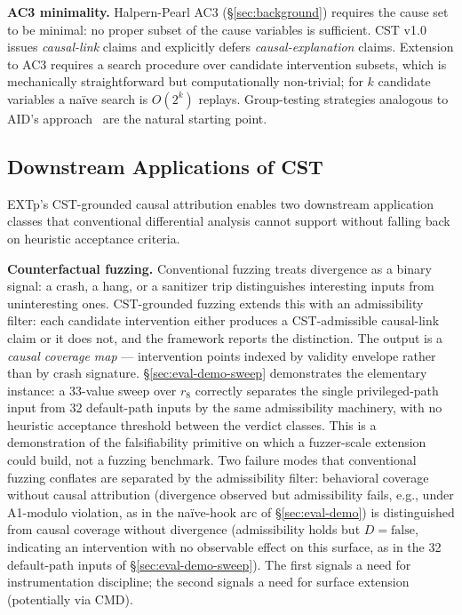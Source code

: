 \documentclass[conference]{IEEEtran}
\begin{document}
\textbf{AC3 minimality.} Halpern-Pearl AC3
(\S\ref{sec:background}) requires the cause set to be minimal:
no proper subset of the cause variables is sufficient. CST v1.0
issues \emph{causal-link} claims and explicitly defers
\emph{causal-explanation} claims. Extension to AC3 requires a
search procedure over candidate intervention subsets, which is
mechanically straightforward but computationally non-trivial; for
$k$ candidate variables a naïve search is $O(2^k)$ replays.
Group-testing strategies analogous to AID's
approach~\cite{fariha2020aid} are the natural starting point.

\subsection{Downstream Applications of CST}\label{sec:discussion-fuzz}

EXTp's CST-grounded causal attribution enables two downstream
application classes that conventional differential analysis cannot
support without falling back on heuristic acceptance criteria.

\textbf{Counterfactual fuzzing.} Conventional fuzzing treats
divergence as a binary signal: a crash, a hang, or a sanitizer
trip distinguishes interesting inputs from uninteresting ones.
CST-grounded fuzzing extends this with an admissibility filter:
each candidate intervention either produces a CST-admissible
causal-link claim or it does not, and the framework reports the
distinction. The output is a \emph{causal coverage map} ---
intervention points indexed by validity envelope rather than by
crash signature. \S\ref{sec:eval-demo-sweep} demonstrates the
elementary instance: a 33-value sweep over $r_8$ correctly
separates the single privileged-path input from 32 default-path
inputs by the same admissibility machinery, with no heuristic
acceptance threshold between the verdict classes. This is a
demonstration of the falsifiability primitive on which a
fuzzer-scale extension could build, not a fuzzing benchmark.
Two failure modes that conventional fuzzing conflates are
separated by the admissibility filter: behavioral coverage
without causal attribution (divergence observed but admissibility
fails, e.g., under A1-modulo violation, as in the naïve-hook
arc of \S\ref{sec:eval-demo}) is distinguished from causal
coverage without divergence (admissibility holds but
$D = \text{false}$, indicating an intervention with no observable
effect on this surface, as in the 32 default-path inputs of
\S\ref{sec:eval-demo-sweep}). The first signals a need for
instrumentation discipline; the second signals a need for
surface extension (potentially via CMD).
\end{document}
